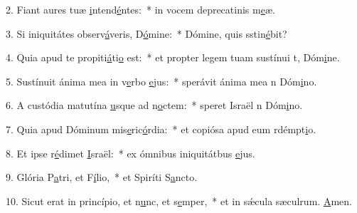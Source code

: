 2. Fiant aures tuæ \uline{i}ntend\uline{é}ntes:~* in vocem deprecatinis m\uline{e}æ.\par 
3. Si iniquitátes observ\uline{á}veris, D\uline{ó}mine:~* Dómine, quis sstin\uline{é}bit?\par 
4. Quia apud te propiti\uline{á}ti\uline{o} est:~* et propter legem tuam sustínui t, Dóm\uline{i}ne.\par 
5. Sustínuit ánima mea in v\uline{e}rbo \uline{e}jus:~* sperávit ánima mea n Dóm\uline{i}no.\par 
6. A custódia matutína \uline{u}sque ad n\uline{o}ctem:~* speret Israël n Dóm\uline{i}no.\par 
7. Quia apud Dóminum mis\uline{e}ric\uline{ó}rdia:~* et copiósa apud eum rdémpt\uline{i}o.\par 
8. Et ipse r\uline{é}dimet \uline{I}sraël:~* ex ómnibus iniquitátbus \uline{e}jus.\par 
9. Glória P\uline{a}tri, et F\uline{í}lio,~* et Spiríti S\uline{a}ncto.\par 
10. Sicut erat in princípio, et n\uline{u}nc, et s\uline{e}mper,~* et in sǽcula sæculrum. \uline{A}men.\par 
